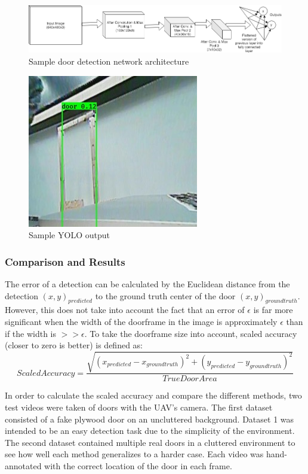 \documentclass[12pt]{article}
\begin{document}
\begin{figure}
	\centering
	\includegraphics[scale=0.5]{arch}
	\vspace{20pt}
	\caption[Sample door detection network architecture]{Sample door detection network architecture}
	\label{arch}
\end{figure}

\begin{figure}
	\centering
	\includegraphics[scale=0.55]{yolo_out}
	\vspace{20pt}
	\caption[Sample YOLO output]{Sample YOLO output}
    \label{yolo_out}
\end{figure}

\subsubsection{Comparison and Results}
The error of a detection can be calculated by the Euclidean distance from the detection $(x,y)_{predicted}$ to the ground truth center of the door $(x,y)_{groundtruth}$. However, this does not take into account the fact that an error of $\epsilon$ is far more significant when the width of the doorframe in the image is approximately $\epsilon$ than if the width is $>>\epsilon$. To take the doorframe size into account, scaled accuracy (closer to zero is better) is defined as: 
\begin{equation}
    ScaledAccuracy = \frac{\sqrt{(x_{predicted}-x_{groundtruth})^2 + (y_{predicted}-y_{groundtruth})^2}}{TrueDoorArea}
\end{equation}

In order to calculate the scaled accuracy and compare the different methods, two test videos were taken of doors with the UAV's camera. The first dataset consisted of a fake plywood door on an uncluttered background. Dataset 1 was intended to be an easy detection task due to the simplicity of the environment. The second dataset contained multiple real doors in a cluttered environment to see how well each method generalizes to a harder case. Each video was hand-annotated with the correct location of the door in each frame. 
\end{document}
